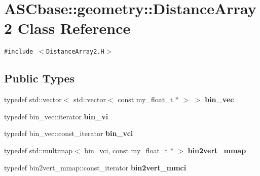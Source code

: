 \section{ASCbase::geometry::Distance\-Array2 Class Reference}
\label{classASCbase_1_1geometry_1_1DistanceArray2}
{\tt \#include $<$Distance\-Array2.H$>$}

\subsection*{Public Types}
\begin{CompactItemize}
\item 
typedef std::vector$<$ std::vector$<$ const my\_\-float\_\-t $\ast$ $>$ $>$ \textbf{bin\_\-vec}\label{classASCbase_1_1geometry_1_1DistanceArray2_5671c6bffbec6d424869132a9b8278fe}

\item 
typedef bin\_\-vec::iterator \textbf{bin\_\-vi}\label{classASCbase_1_1geometry_1_1DistanceArray2_3b8950a2f913a1c99f07cd8207b8d4c7}

\item 
typedef bin\_\-vec::const\_\-iterator \textbf{bin\_\-vci}\label{classASCbase_1_1geometry_1_1DistanceArray2_edfb950bc7209814dc46236e34e2dc31}

\item 
typedef std::multimap$<$ bin\_\-vci, const my\_\-float\_\-t $\ast$ $>$ \textbf{bin2vert\_\-mmap}\label{classASCbase_1_1geometry_1_1DistanceArray2_1cb8df28537da9c452689b0424c4f38b}

\item 
typedef bin2vert\_\-mmap::const\_\-iterator \textbf{bin2vert\_\-mmci}\label{classASCbase_1_1geometry_1_1DistanceArray2_0e789f5551c49ffa057399daf777fb66}

\end{CompactItemize}
